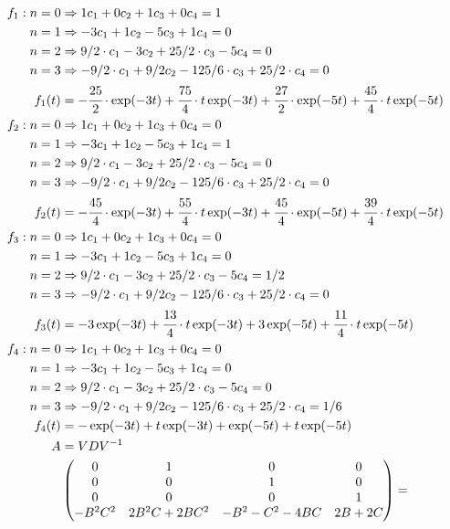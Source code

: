 \documentclass[12pt,a4paper]{article}
\begin{document}
\begin{align}
f_1: n = 0 &\Rightarrow 1 c_1 + 0 c_2 + 1 c_3 + 0 c_4 = 1 \\
n = 1 &\Rightarrow -3 c_1 + 1 c_2 - 5 c_3 + 1 c_4 = 0  \\
n = 2 &\Rightarrow 9/2\cdot c_1 - 3 c_2 + 25/2\cdot c_3 - 5 c_4 = 0 \\
n = 3 &\Rightarrow - 9/2\cdot c_1 + 9/2 c_2 - 125/6\cdot c_3 + 25/2\cdot c_4 = 0 \\
f_1(t) &= - \cfrac{25}{2}\cdot \exp(-3t) + \cfrac{75}{4}\cdot t \exp(-3t) + \cfrac{27}{2}\cdot \exp(-5t) + \cfrac{45}{4}\cdot t \exp(-5t) \\
f_2: n = 0 &\Rightarrow 1 c_1 + 0 c_2 + 1 c_3 + 0 c_4 = 0 \\
n = 1 &\Rightarrow -3 c_1 + 1 c_2 - 5 c_3 + 1 c_4 = 1  \\
n = 2 &\Rightarrow 9/2\cdot c_1 - 3 c_2 + 25/2\cdot c_3 - 5 c_4 = 0 \\
n = 3 &\Rightarrow - 9/2\cdot c_1 + 9/2 c_2 - 125/6\cdot c_3 + 25/2\cdot c_4 = 0 \\
f_2(t) &= - \cfrac{45}{4}\cdot \exp(-3t) + \cfrac{55}{4}\cdot t \exp(-3t) + \cfrac{45}{4}\cdot \exp(-5t) + \cfrac{39}{4}\cdot t \exp(-5t) \\
f_3: n = 0 &\Rightarrow 1 c_1 + 0 c_2 + 1 c_3 + 0 c_4 = 0 \\
n = 1 &\Rightarrow -3 c_1 + 1 c_2 - 5 c_3 + 1 c_4 = 0  \\
n = 2 &\Rightarrow 9/2\cdot c_1 - 3 c_2 + 25/2\cdot c_3 - 5 c_4 = 1/2 \\
n = 3 &\Rightarrow - 9/2\cdot c_1 + 9/2 c_2 - 125/6\cdot c_3 + 25/2\cdot c_4 = 0 \\
f_3(t) &=- 3 \exp(-3t) + \cfrac{13}{4}\cdot t \exp(-3t) + 3 \exp(-5t) + \cfrac{11}{4}\cdot t \exp(-5t) \\
f_4: n = 0 &\Rightarrow 1 c_1 + 0 c_2 + 1 c_3 + 0 c_4 = 0 \\
n = 1 &\Rightarrow -3 c_1 + 1 c_2 - 5 c_3 + 1 c_4 = 0  \\
n = 2 &\Rightarrow 9/2\cdot c_1 - 3 c_2 + 25/2\cdot c_3 - 5 c_4 = 0 \\
n = 3 &\Rightarrow - 9/2\cdot c_1 + 9/2 c_2 - 125/6\cdot c_3 + 25/2\cdot c_4 = 1/6 \\
f_4(t) &= - \exp(-3t) + t \exp(-3t) + \exp(-5t) + t \exp(-5t) \\
A &= VDV^{-1} \\
&\left( \begin{matrix} 0 & 1 & 0 & 0 \\ 0 & 0 & 1 & 0 \\ 0 & 0 & 0 & 1 \\ -B^2C^2 & 2B^2C + 2BC^2 & -B^2-C^2-4BC & 2B+2C \end{matrix} \right) = \nonumber \\

\end{align}
\end{document}
